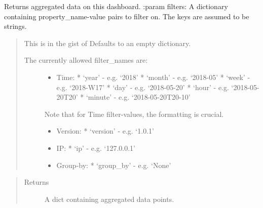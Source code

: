 \documentclass[letterpaper,10pt,english]{sphinxmanual}
\begin{document}
\begin{fulllineitems}
\begin{fulllineitems}
\begin{quote}
\begin{description}
\end{description}\end{quote}

\end{fulllineitems}


\begin{fulllineitems}
\label{\detokenize{pydash_app.dashboard.entity:pydash_app.dashboard.entity.Dashboard.aggregated_data}}
Returns aggregated data on this dashboard.
:param filters: A dictionary containing property\_name-value pairs to filter on. The keys are assumed to be strings.
\begin{quote}

This is in the gist of 
Defaults to an empty dictionary.
\begin{description}
\item[{The currently allowed filter\_names are:}] \leavevmode\begin{itemize}
\item {} 
Time:
* ‘year’   - e.g. ‘2018’
* ‘month’  - e.g. ‘2018-05’
* ‘week’   - e.g. ‘2018-W17’
* ‘day’    - e.g. ‘2018-05-20’
* ‘hour’   - e.g. ‘2018-05-20T20’
* ‘minute’ - e.g. ‘2018-05-20T20-10’

\end{itemize}

Note that for Time filter-values, the formatting is crucial.
\begin{itemize}
\item {} 
Version:
* ‘version’ - e.g. ‘1.0.1’

\item {} 
IP:
* ‘ip’ - e.g. ‘127.0.0.1’

\item {} 
Group-by:
* ‘group\_by’ - e.g. ‘None’

\end{itemize}

\end{description}
\end{quote}
\begin{quote}\begin{description}
\item[{Returns}] \leavevmode
A dict containing aggregated data points.

\end{description}\end{quote}


\end{fulllineitems}
\end{fulllineitems}
\end{document}
